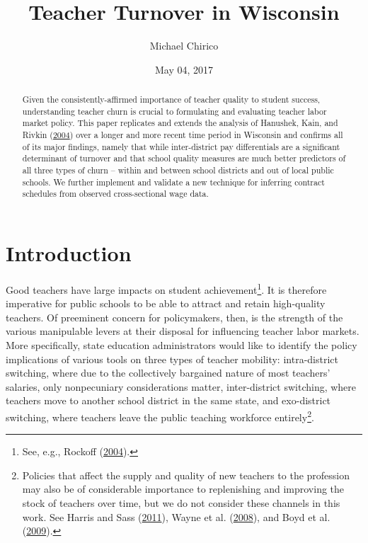 \documentclass[12pt,]{article}
\title{Teacher Turnover in Wisconsin}
\author{Michael Chirico}
\date{May 04, 2017}
\let\rmarkdownfootnote\footnote%
\def\footnote{\protect\rmarkdownfootnote}
\newcommand{\TAG}[1]{}
\begin{document}
\maketitle
\begin{abstract}
Given the consistently-affirmed importance of teacher quality to student
success, understanding teacher churn is crucial to formulating and
evaluating teacher labor market policy. This paper replicates and
extends the analysis of Hanushek, Kain, and Rivkin
(\protect\hyperlink{ref-hanushek}{2004}) over a longer and more recent
time period in Wisconsin and confirms all of its major findings, namely
that while inter-district pay differentials are a significant
determinant of turnover and that school quality measures are much better
predictors of all three types of churn -- within and between school
districts and out of local public schools. We further implement and
validate a new technique for inferring contract schedules from observed
cross-sectional wage data.
\end{abstract}

\section{Introduction}\label{introduction}

\TAG{BEGIN_INTRO}

Good teachers have large impacts on student achievement\footnote{See,
  e.g., Rockoff (\protect\hyperlink{ref-rockoff}{2004}).}. It is
therefore imperative for public schools to be able to attract and retain
high-quality teachers. Of preeminent concern for policymakers, then, is
the strength of the various manipulable levers at their disposal for
influencing teacher labor markets. More specifically, state education
administrators would like to identify the policy implications of various
tools on three types of teacher mobility: intra-district switching,
where due to the collectively bargained nature of most teachers'
salaries, only nonpecuniary considerations matter, inter-district
switching, where teachers move to another school district in the same
state, and exo-district switching, where teachers leave the public
teaching workforce entirely\footnote{Policies that affect the supply and
  quality of new teachers to the profession may also be of considerable
  importance to replenishing and improving the stock of teachers over
  time, but we do not consider these channels in this work. See Harris
  and Sass (\protect\hyperlink{ref-harris}{2011}), Wayne et al.
  (\protect\hyperlink{ref-wayne}{2008}), and Boyd et al.
  (\protect\hyperlink{ref-boyd2009}{2009}).}.
\end{document}
